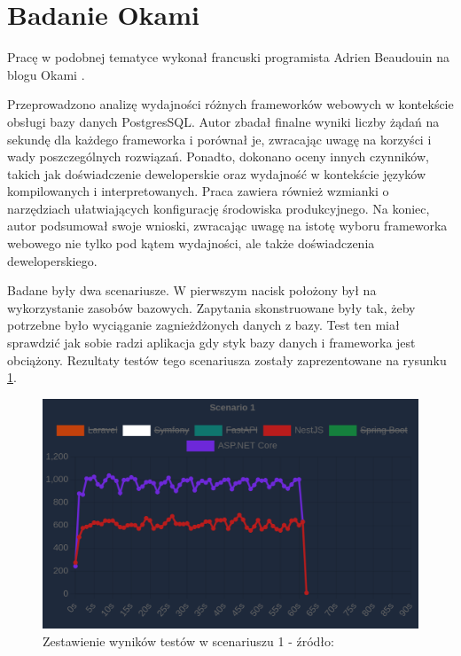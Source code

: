 \section{Badanie Okami}
Pracę w podobnej tematyce wykonał francuski programista Adrien Beaudouin na blogu Okami \cite{okami1012024Benchmark}.

Przeprowadzono analizę wydajności różnych frameworków webowych w kontekście obsługi bazy danych PostgresSQL.
Autor zbadał finalne wyniki liczby żądań na sekundę dla każdego frameworka i porównał je, zwracając uwagę na korzyści i wady poszczególnych rozwiązań. 
Ponadto, dokonano oceny innych czynników, takich jak doświadczenie deweloperskie oraz wydajność w kontekście języków kompilowanych i interpretowanych.
Praca zawiera również wzmianki o narzędziach ułatwiających konfigurację środowiska produkcyjnego.
Na koniec, autor podsumował swoje wnioski, zwracając uwagę na istotę wyboru frameworka webowego nie tylko pod kątem wydajności, ale także doświadczenia deweloperskiego.

Badane były dwa scenariusze.
W pierwszym nacisk położony był na wykorzystanie zasobów bazowych. 
Zapytania skonstruowane były tak, żeby potrzebne było wyciąganie zagnieżdżonych danych z bazy.
Test ten miał sprawdzić jak sobie radzi aplikacja gdy styk bazy danych i frameworka jest obciążony.
Rezultaty testów tego scenariusza zostały zaprezentowane na rysunku \ref{rys:oklatest1}.
\begin{figure}[!hb]
	\centering \includegraphics[width=1\linewidth]{rysunki/okla_test_1.png}
	\caption{Zestawienie wyników testów w scenariuszu 1 - źródło: \cite{okami1012024Benchmark}}
	\label{rys:oklatest1}
\end{figure}

